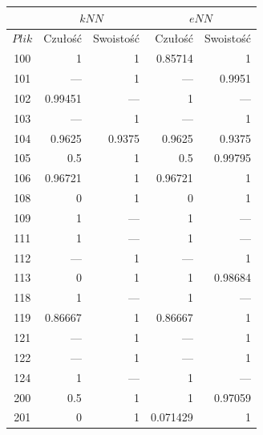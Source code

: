 \begin{table}[H]
	\centering
	\begin{tabular}{|c|r|r|r|r|}
		\hline
		& \multicolumn{2}{c|}{$kNN$} & \multicolumn{2}{c|}{$eNN$} \\
		\hline
		$Plik$ & Czułość & Swoistość & Czułość & Swoistość \\
		\hline
100 &1 &1 &0.85714 &1\\                  
\hline                                   
101 &--- &1 &--- &0.9951\\               
\hline                                   
102 &0.99451 &--- &1 &---\\              
\hline                                   
103 &--- &1 &--- &1\\                    
\hline                                   
104 &0.9625 &0.9375 &0.9625 &0.9375\\    
\hline                                   
105 &0.5 &1 &0.5 &0.99795\\              
\hline                                   
106 &0.96721 &1 &0.96721 &1\\            
\hline                                   
108 &0 &1 &0 &1\\                        
\hline                                   
109 &1 &--- &1 &---\\                    
\hline                                   
111 &1 &--- &1 &---\\                    
\hline                                   
112 &--- &1 &--- &1\\                    
\hline                                   
113 &0 &1 &1 &0.98684\\                  
\hline                                   
118 &1 &--- &1 &---\\                    
\hline                                   
119 &0.86667 &1 &0.86667 &1\\            
\hline                                   
121 &--- &1 &--- &1\\                    
\hline                                   
122 &--- &1 &--- &1\\                    
\hline                                   
124 &1 &--- &1 &---\\                    
\hline                                   
200 &0.5 &1 &1 &0.97059\\                
\hline                                   
201 &0 &1 &0.071429 &1\\                 

\end{tabular}
\end{table}
